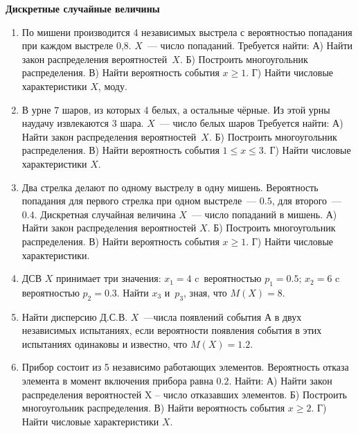 \documentclass[a4paper,14pt]{extarticle}
\begin{document}
{\centering 
{
\bfseries Дискретные случайные величины \par}
\begin{enumerate}
\item  По мишени производится 4 независимых выстрела с вероятностью попадания при каждом выстреле 0,8. $X$~--- число попаданий. Требуется найти: А) Найти закон распределения вероятностей~$X$. Б) Построить многоугольник распределения. В) Найти вероятность события $x\geqslant 1$. Г) Найти числовые характеристики $X$, моду.
\item В урне 7 шаров, из которых 4 белых, а остальные чёрные. Из этой урны наудачу извлекаются 3 шара. $X$~--- число белых шаров Требуется найти: А) Найти закон распределения вероятностей~$X$. Б) Построить многоугольник распределения. В) Найти вероятность события $1\leqslant x\leqslant 3$. Г) Найти числовые характеристики $X$.
\item Два стрелка делают по одному выстрелу в одну мишень. Вероятность попадания для первого стрелка при одном выстреле~--- $0.5$, для второго~--- $0.4$. Дискретная случайная величина $X$~--- число попаданий в мишень. А) Найти закон распределения вероятностей $X$. Б) Построить многоугольник распределения. В) Найти вероятность события $x\geqslant 1$. Г) Найти числовые характеристики.
\item ДСВ $X$ принимает три значения: $x_1=4$ c~вероятностью $p_1=0.5$; $x_2=6$ c вероятностью $p_2=0.3$. Найти $x_3$ и~$p_3$, зная, что $M(X)=8$.
\item  Найти дисперсию Д.С.В. $X$~---числа появлений события А в двух независимых испытаниях, если вероятности появления события в этих испытаниях одинаковы и известно, что $M(X)=1.2$.
\item Прибор состоит из 5 независимо работающих элементов. Вероятность отказа элемента в момент включения прибора равна $0.2$. Найти: А) Найти закон распределения вероятностей X – число отказавших элементов. Б) Построить многоугольник распределения. В) Найти вероятность события $x\geqslant 2$. Г) Найти числовые характеристики $X$.

\end{enumerate}}
\end{document}
